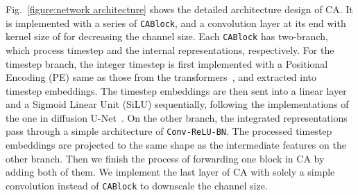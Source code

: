 \documentclass{article}
\begin{document}
Fig.~\ref{figure:network architecture} shows the detailed architecture design of CA. It is implemented with a series of \texttt{CABlock}, and a convolution layer at its end with kernel size of  for decreasing the channel size. Each \texttt{CABlock} has two-branch, which process timestep and the internal representations, respectively. For the timestep branch, the integer timestep is first implemented with a Positional Encoding (PE) same as those from the transformers~\cite{NIPS2017_3f5ee243}, and extracted into timestep embeddings. The timestep embeddings are then sent into a linear layer and a Sigmoid Linear Unit (SiLU) sequentially, following the implementations of the one in diffusion U-Net~\cite{rombach2022high}. On the other branch, the integrated representations pass through a simple architecture of \texttt{Conv-ReLU-BN}. The processed timestep embeddings are projected to the same shape as the intermediate features on the other branch. Then we finish the process of forwarding one block in CA by adding both of them. We implement the last layer of CA with solely a simple  convolution instead of \texttt{CABlock} to downscale the channel size.
\end{document}
